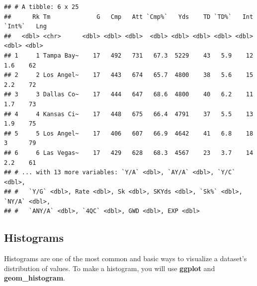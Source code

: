 \documentclass[
  11pt,
]{book}
\theoremstyle{definition}
\theoremstyle{definition}
\theoremstyle{definition}
\theoremstyle{definition}
\theoremstyle{remark}
\begin{document}
\begin{verbatim}
## # A tibble: 6 x 25
##      Rk Tm             G   Cmp   Att `Cmp%`   Yds    TD `TD%`   Int `Int%`   Lng
##   <dbl> <chr>      <dbl> <dbl> <dbl>  <dbl> <dbl> <dbl> <dbl> <dbl>  <dbl> <dbl>
## 1     1 Tampa Bay~    17   492   731   67.3  5229    43   5.9    12    1.6    62
## 2     2 Los Angel~    17   443   674   65.7  4800    38   5.6    15    2.2    72
## 3     3 Dallas Co~    17   444   647   68.6  4800    40   6.2    11    1.7    73
## 4     4 Kansas Ci~    17   448   675   66.4  4791    37   5.5    13    1.9    75
## 5     5 Los Angel~    17   406   607   66.9  4642    41   6.8    18    3      79
## 6     6 Las Vegas~    17   429   628   68.3  4567    23   3.7    14    2.2    61
## # ... with 13 more variables: `Y/A` <dbl>, `AY/A` <dbl>, `Y/C` <dbl>,
## #   `Y/G` <dbl>, Rate <dbl>, Sk <dbl>, SKYds <dbl>, `Sk%` <dbl>, `NY/A` <dbl>,
## #   `ANY/A` <dbl>, `4QC` <dbl>, GWD <dbl>, EXP <dbl>
\end{verbatim}

\vfill
\newpage

\hypertarget{histograms}{%
\subsection{Histograms}\label{histograms}}

Histograms are one of the most common and basic ways to visualize a dataset's distribution of values. To make a histogram, you will use \textbf{ggplot} and \textbf{geom\_histogram}.
\end{document}

